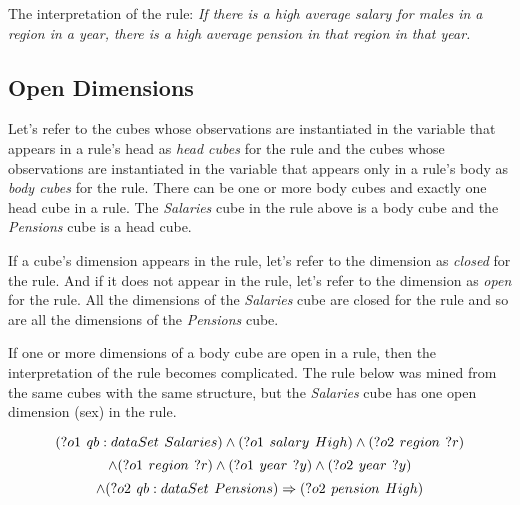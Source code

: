 The interpretation of the rule: \textit{If there is a high average salary for males in a region in a year, there is a high average pension in that region in that year.}

\subsection{Open Dimensions}

Let's refer to the cubes whose observations are instantiated in the variable that appears in a rule's head as \textit{head cubes} for the rule and the cubes whose observations are instantiated in the variable that appears only in a rule's body as \textit{body cubes} for the rule. There can be one or more body cubes and exactly one head cube in a rule. The \textit{Salaries} cube in the rule above is a body cube and the \textit{Pensions} cube is a head cube. 

If a cube's dimension appears in the rule, let's refer to the dimension as \textit{closed} for the rule. And if it does not appear in the rule, let's refer to the dimension as \textit{open} for the rule. All the dimensions of the \textit{Salaries} cube are closed for the rule and so are all the dimensions of the \textit{Pensions} cube.

If one or more dimensions of a body cube are open in a rule, then the interpretation of the rule becomes complicated. The rule below was mined from the same cubes with the same structure, but the \textit{Salaries} cube has one open dimension (sex) in the rule.

$$
(?o1\hspace{0.4em}qb:dataSet\hspace{0.4em}Salaries) \land (?o1\hspace{0.4em}salary\hspace{0.4em}High) \land (?o2\hspace{0.4em}region\hspace{0.4em}?r)
$$
$$
\land (?o1\hspace{0.4em}region\hspace{0.4em}?r) \land (?o1\hspace{0.4em}year\hspace{0.4em}?y) \land (?o2\hspace{0.4em}year\hspace{0.4em}?y)
$$
$$
\land (?o2\hspace{0.4em}qb:dataSet\hspace{0.4em}Pensions) \Rightarrow (?o2\hspace{0.4em}pension\hspace{0.4em}High)
$$

